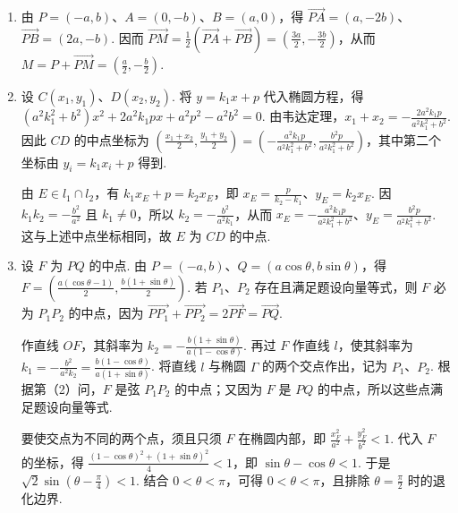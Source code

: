 \begin{solution}
\begin{enumerate}
\item 由 \(P=(-a,b)\)、\(A=(0,-b)\)、\(B=(a,0)\)，得 \(\overrightarrow{PA}=(a,-2b)\)、\(\overrightarrow{PB}=(2a,-b)\). 因而 \(\overrightarrow{PM}=\frac{1}{2}\left(\overrightarrow{PA}+\overrightarrow{PB}\right)=\left(\frac{3a}{2},-\frac{3b}{2}\right)\)，从而 \(M=P+\overrightarrow{PM}=\left(\frac{a}{2},-\frac{b}{2}\right)\).

\item 设 \(C(x_1,y_1)\)、\(D(x_2,y_2)\). 将 \(y=k_1x+p\) 代入椭圆方程，得 \(\left(a^2k_1^2+b^2\right)x^2+2a^2k_1px+a^2p^2-a^2b^2=0\). 由韦达定理，\(x_1+x_2=-\frac{2a^2k_1p}{a^2k_1^2+b^2}\). 因此 \(CD\) 的中点坐标为
\(\left(\frac{x_1+x_2}{2},\frac{y_1+y_2}{2}\right)=\left(-\frac{a^2k_1p}{a^2k_1^2+b^2},\frac{b^2p}{a^2k_1^2+b^2}\right)\)，其中第二个坐标由 \(y_i=k_1x_i+p\) 得到.

由 \(E\in l_1\cap l_2\)，有 \(k_1x_E+p=k_2x_E\)，即 \(x_E=\frac{p}{k_2-k_1}\)、\(y_E=k_2x_E\). 因 \(k_1k_2=-\frac{b^2}{a^2}\) 且 \(k_1\neq0\)，所以 \(k_2=-\frac{b^2}{a^2k_1}\)，从而 \(x_E=-\frac{a^2k_1p}{a^2k_1^2+b^2}\)、\(y_E=\frac{b^2p}{a^2k_1^2+b^2}\). 这与上述中点坐标相同，故 \(E\) 为 \(CD\) 的中点.

\item 设 \(F\) 为 \(PQ\) 的中点. 由 \(P=(-a,b)\)、\(Q=(a\cos\theta,b\sin\theta)\)，得 \(F=\left(\frac{a(\cos\theta-1)}{2},\frac{b(1+\sin\theta)}{2}\right)\). 若 \(P_1\)、\(P_2\) 存在且满足题设向量等式，则 \(F\) 必为 \(P_1P_2\) 的中点，因为 \(\overrightarrow{PP_1}+\overrightarrow{PP_2}=2\overrightarrow{PF}=\overrightarrow{PQ}\).

作直线 \(OF\)，其斜率为 \(k_2=-\frac{b(1+\sin\theta)}{a(1-\cos\theta)}\). 再过 \(F\) 作直线 \(l\)，使其斜率为 \(k_1=-\frac{b^2}{a^2k_2}=\frac{b(1-\cos\theta)}{a(1+\sin\theta)}\). 将直线 \(l\) 与椭圆 \(\Gamma\) 的两个交点作出，记为 \(P_1\)、\(P_2\). 根据第（2）问，\(F\) 是弦 \(P_1P_2\) 的中点；又因为 \(F\) 是 \(PQ\) 的中点，所以这些点满足题设向量等式.

要使交点为不同的两个点，须且只须 \(F\) 在椭圆内部，即 \(\frac{x_F^2}{a^2}+\frac{y_F^2}{b^2}<1\). 代入 \(F\) 的坐标，得 \(\frac{(1-\cos\theta)^2+(1+\sin\theta)^2}{4}<1\)，即 \(\sin\theta-\cos\theta<1\). 于是 \(\sqrt{2}\sin\left(\theta-\frac{\pi}{4}\right)<1\). 结合 \(0<\theta<\pi\)，可得 \(0<\theta<\pi\)，且排除 \(\theta=\frac{\pi}{2}\) 时的退化边界.
\end{enumerate}
\end{solution}

